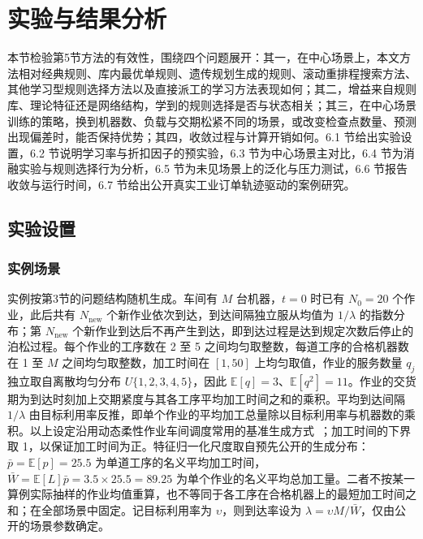 \section{实验与结果分析}

本节检验第5节方法的有效性，围绕四个问题展开：其一，在中心场景上，本文方法相对经典规则、库内最优单规则、遗传规划生成的规则、滚动重排程搜索方法、其他学习型规则选择方法以及直接派工的学习方法表现如何；其二，增益来自规则库、理论特征还是网络结构，学到的规则选择是否与状态相关；其三，在中心场景训练的策略，换到机器数、负载与交期松紧不同的场景，或改变检查点数量、预测出现偏差时，能否保持优势；其四，收敛过程与计算开销如何。6.1 节给出实验设置，6.2 节说明学习率与折扣因子的预实验，6.3 节为中心场景主对比，6.4 节为消融实验与规则选择行为分析，6.5 节为未见场景上的泛化与压力测试，6.6 节报告收敛与运行时间，6.7 节给出公开真实工业订单轨迹驱动的案例研究。

\subsection{实验设置}

\subsubsection{实例场景}

实例按第3节的问题结构随机生成。车间有 $M$ 台机器，$t=0$ 时已有 $N_0=20$ 个作业，此后共有 $N_{\mathrm{new}}$ 个新作业依次到达，到达间隔独立服从均值为 $1/\lambda$ 的指数分布；第 $N_{\mathrm{new}}$ 个新作业到达后不再产生到达，即到达过程是达到规定次数后停止的泊松过程。每个作业的工序数在 2 至 5 之间均匀取整数，每道工序的合格机器数在 1 至 $M$ 之间均匀取整数，加工时间在 $[1,50]$ 上均匀取值，作业的服务数量 $q_j$ 独立取自离散均匀分布 $U\{1,2,3,4,5\}$，因此 $\mathbb{E}[q]=3$、$\mathbb{E}[q^2]=11$。作业的交货期为到达时刻加上交期紧度与其各工序平均加工时间之和的乘积。平均到达间隔 $1/\lambda$ 由目标利用率反推，即单个作业的平均加工总量除以目标利用率与机器数的乘积。以上设定沿用动态柔性作业车间调度常用的基准生成方式~\cite{luo2020,tiacci2024}；加工时间的下界取 1，以保证加工时间为正。特征归一化尺度取自预先公开的生成分布：$\bar p=\mathbb{E}[p]=25.5$ 为单道工序的名义平均加工时间，$\bar W=\mathbb{E}[L]\bar p=3.5\times25.5=89.25$ 为单个作业的名义平均总加工量。二者不按某一算例实际抽样的作业均值重算，也不等同于各工序在合格机器上的最短加工时间之和；在全部场景中固定。记目标利用率为 $\upsilon$，则到达率设为 $\lambda=\upsilon M/\bar W$，仅由公开的场景参数确定。

